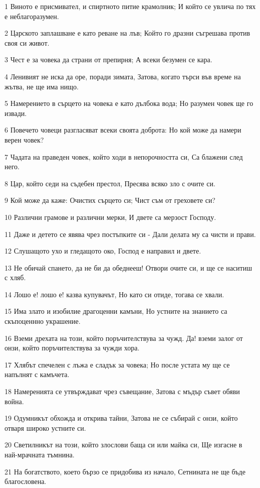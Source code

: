 \par 1 Виното е присмивател, и спиртното питие крамолник; И който се увлича по тях е неблагоразумен.
\par 2 Царското заплашване е като реване на лъв; Който го дразни съгрешава против своя си живот.
\par 3 Чест е за човека да страни от препирня; А всеки безумен се кара.
\par 4 Ленивият не иска да оре, поради зимата, Затова, когато търси във време на жътва, не ще има нищо.
\par 5 Намерението в сърцето на човека е като дълбока вода; Но разумен човек ще го извади.
\par 6 Повечето човеци разгласяват всеки своята доброта: Но кой може да намери верен човек?
\par 7 Чадата на праведен човек, който ходи в непорочността си, Са блажени след него.
\par 8 Цар, който седи на съдебен престол, Пресява всяко зло с очите си.
\par 9 Кой може да каже: Очистих сърцето си; Чист съм от греховете си?
\par 10 Различни грамове и различни мерки, И двете са мерзост Господу.
\par 11 Даже и детето се явява чрез постъпките си - Дали делата му са чисти и прави.
\par 12 Слушащото ухо и гледащото око, Господ е направил и двете.
\par 13 Не обичай спането, да не би да обеднееш! Отвори очите си, и ще се наситиш с хляб.
\par 14 Лошо е! лошо е! казва купувачът, Но като си отиде, тогава се хвали.
\par 15 Има злато и изобилие драгоценни камъни, Но устните на знанието са скъпоценнно украшение.
\par 16 Вземи дрехата на този, който поръчителствува за чужд. Да! вземи залог от онзи, който поръчителствува за чужди хора.
\par 17 Хлябът спечелен с лъжа е сладък за човека; Но после устата му ще се напълнят с камъчета.
\par 18 Намеренията се утвърждават чрез съвещание, Затова с мъдър съвет обяви война.
\par 19 Одумникът обхожда и открива тайни, Затова не се събирай с онзи, който отваря широко устните си.
\par 20 Светилникът на този, който злослови баща си или майка си, Ще изгасне в най-мрачната тъмнина.
\par 21 На богатството, което бързо се придобива из начало, Сетнината не ще бъде благословена.
